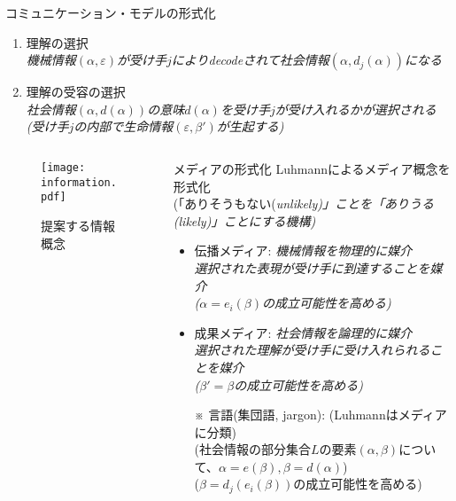 \begin{columns}[onlytextwidth,t]
\begin{column}{.47\hsize}
\begin{block}{コミュニケーション・モデルの形式化}
\begin{enumerate}
	\item \alert{理解の選択} \\
		\em{機械情報}$(\alpha, \varepsilon)$が受け手$j$によりdecodeされて\em{社会情報}$(\alpha, d_j(\alpha))$になる
	\item \alert{理解の受容の選択} \\
		\em{社会情報}$(\alpha, d(\alpha))$の意味$d(\alpha)$を受け手$j$が受け入れるかが選択される \\
		(受け手$j$の内部で生命情報$(\varepsilon, \beta')$が生起する)
\end{enumerate}
\end{block}
\end{column}
\end{columns}

\begin{columns}[onlytextwidth,t]
\begin{column}{.5\hsize}
\begin{figure}[hbtp]{\centering
\texttt{[image: information.pdf]}
\caption{提案する情報概念}
}\end{figure}
\end{column}
\begin{column}{.47\hsize}
\begin{block}{メディアの形式化}
Luhmannによるメディア概念\cite{borch}\cite{nishigaki1}を形式化 \\
(「ありそうもない(\em{unlikely})」ことを「ありうる(\em{likely})」ことにする機構)
\begin{itemize}
	\item \alert{伝播メディア}: \em{機械情報}を\em{物理的}に媒介 \\
		選択された表現が受け手に到達することを媒介 \\
		($\alpha = e_i(\beta)$の成立可能性を高める)
	\item \alert{成果メディア}: \em{社会情報}を\em{論理的}に媒介 \\
		選択された理解が受け手に受け入れられることを媒介 \\
		($\beta' = \beta$の成立可能性を高める)
	\item[※] 言語(集団語, jargon): (Luhmannはメディアに分類) \\
		(社会情報の部分集合$L$の要素$(\alpha, \beta)$について、$\alpha = e(\beta), \beta = d(\alpha)$) \\
		($\beta = d_j(e_i(\beta))$の成立可能性を高める)
\end{itemize}
\end{block}
\end{column}
\end{columns}


